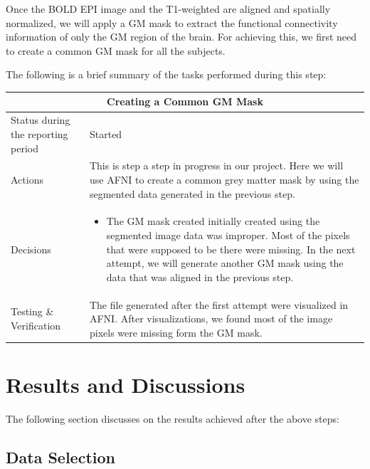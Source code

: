 \documentclass[12pt]{article}
\begin{document}
Once the BOLD EPI image and the T1-weighted are aligned and spatially
normalized, we will apply a GM mask to extract the functional
connectivity information of only the GM region of the brain. For
achieving this, we first need to create a common GM mask for all the
subjects.

The following is a brief summary of the tasks performed during this
step:

\begin{table}[H]
  \centering
  \begin{tabular} {| m{3.3cm} | m{11.5cm} | }
    \hline
    \multicolumn{2}{|c|}{Creating a Common GM Mask} \\ \hline
    Status during the reporting period & Started    \\ \hline
    Actions &
    This is step a step in progress in our project. Here we will use
    AFNI to create a common grey matter mask by using the segmented
    data generated in the previous step. \\ \hline

    Decisions &
    \begin{itemize}

      \item The GM mask created initially created using the segmented
        image data was improper. Most of the pixels that were supposed
        to be there were missing. In the next attempt, we will
        generate another GM mask using the data that was aligned in
        the previous step.

    \end{itemize} \\ \hline

    Testing \& Verification &
    The file generated after the first attempt were visualized in
    AFNI. After visualizations, we found most of the image pixels were
    missing form the GM mask. \\ \hline

  \end{tabular}
\end{table}

\newpage
\section{Results and Discussions}

The following section discusses on the results achieved after the
above steps:

\subsection{Data Selection}%
\label{sub:data_selection}
\end{document}
